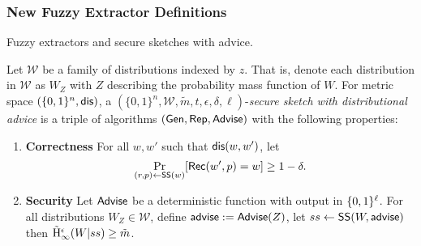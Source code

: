     

\subsubsection{New Fuzzy Extractor Definitions}
Fuzzy extractors and secure sketches with advice. 

\begin{definition}
\label{def:ss distributional}
Let $\mathcal{W}$ be a family of distributions indexed by $z$.  That is, denote each distribution in $\mathcal{W}$ as $W_Z$ with $Z$ describing the probability mass function of $W$.  
For metric space $(\{0,1\}^n, \mathsf{dis})$, a $(\{0,1\}^n, \mathcal{W}, \tilde{m}, t, \epsilon, \delta, \ell)$-\emph{secure sketch with distributional advice} is a triple of algorithms $({\mathsf{Gen}}, {\mathsf{Rep}}, {\mathsf{Advise}})$ with the following properties:
\begin{enumerate} 
\itemsep0em
\item \textbf{Correctness} For all $w, w'$ such that $\mathsf{dis}(w, w')$, let \[\Pr_{(r, p) \leftarrow {\ensuremath{\mathsf{SS}}}(w)}[{\mathsf{Rec}}(w', p) = w]\ge 1-\delta.\]
\item \textbf{Security} Let ${\mathsf{Advise}}$ be a deterministic function with output in $\{0, 1\}^\ell$.  For all distributions $W_Z \in \mathcal{W}$, define ${\mathsf{advise}}:= {\mathsf{Advise}}(Z)$, let $ss \leftarrow {\ensuremath{\mathsf{SS}}}(W, {\mathsf{advise}})$ then $\tilde{\mathrm{H}}_\infty^\epsilon(W| ss) \ge \tilde{m}$.
\end{enumerate}
\end{definition}


